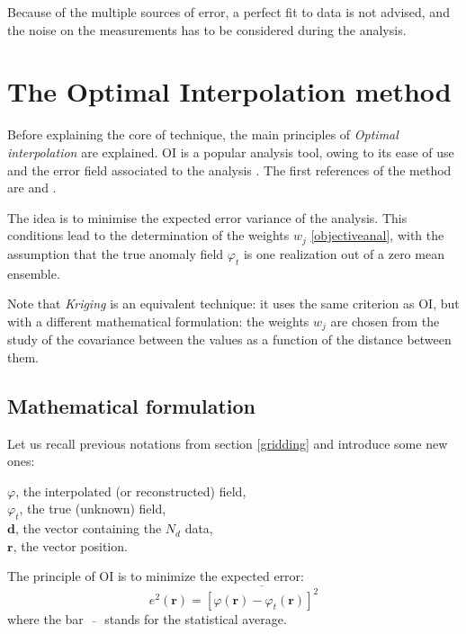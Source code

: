 Because of the multiple sources of error, a perfect fit to data is not advised, and the noise on the measurements has to be considered during the analysis.

\section[Optimal Interpolation]{The Optimal Interpolation method\label{sec:OImethod}}
 
Before explaining the core of \diva technique, the main principles of \textit{Optimal interpolation} \citep[OI,][]{STOR99,CHILES99} are explained. OI is a popular analysis tool, owing to its ease of use and the error field associated to the analysis \citep[e.g.,][]{SHEN98b,KAPLAN00}. The first references of the method are \citet{GANDIN65} and \citet{BRETHERTON76}.

The idea is to minimise the expected error variance of the analysis. This conditions lead to the determination of the weights  $w_j$ \eqref{objectiveanal}, with the assumption that the true anomaly field $\varphi_t$ is one realization out of a zero mean ensemble. 

Note that \textit{Kriging} \citep{KRIGE51,MATHERON63} is an equivalent technique: it uses the same criterion as OI, but with a different mathematical formulation: the weights $w_{j}$ are chosen from the study of the covariance between the values as a function of the distance between them.

\subsection{Mathematical formulation}

Let us recall previous notations from section \ref{gridding} and introduce some new ones:

$\varphi$, the interpolated (or reconstructed) field,\\
$\varphi_{t}$, the true (unknown) field,\\
$\mathbf{d}$, the vector containing the $N_{d}$ data,\\
$\mathbf{r}$, the vector position.

The principle of OI is to minimize the expected error:
\begin{equation}
e^{2}(\mathbf{r}) = \overline{[\varphi(\mathbf{r})-\varphi_{t}(\mathbf{r})]^{2}}
\end{equation}
where the bar $\bar{\quad}$ stands for the statistical average.


